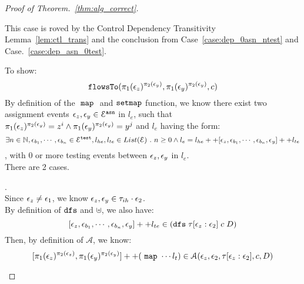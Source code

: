 \begin{proof}[Proof of Theorem.~\ref{thm:alg_correct}]
\begin{case}
\begin{subproof}
\begin{subsubcase}
    This case is roved by the Control Dependency Transitivity Lemma~\ref{lem:ctl_trans} and the conclusion from Case~\ref{case:dep_0asn_ntest} and Case.~\ref{case:dep_asn_0test}.
  \end{subsubcase}
\end{subproof}
To show:
\[  
\mathtt{flowsTo}(\pi_1(\mathtt{\epsilon}_z)^{\pi_2(\mathtt{\epsilon}_y)}, \pi_1(\mathtt{\epsilon}_y)^{\pi_2(\mathtt{\epsilon}_y)}, c)
\]
By definition of the $~\mathtt{map}~$ and $\mathtt{setmap}$ function, we know there exist 
two assignment events
$\mathtt{\epsilon}_z, \mathtt{\epsilon}_y \in \mathcal{E}^{\mathtt{{asn}}}$ in $l_e$,
such that $ \pi_1(\mathtt{\epsilon}_z)^{\pi_2(\mathtt{\epsilon}_y)} = z^i \land \pi_1(\mathtt{\epsilon}_y)^{\pi_2(\mathtt{\epsilon}_y)} = y^j$
and $l_e$ having the form:
\\
\[
 \exists  n \in \mathbb{N}, \mathtt{\epsilon}_{b_1}, \cdots, \mathtt{\epsilon}_{b_n} \in \mathcal{E}^{\mathtt{{test}}}, l_{he}, l_{te} \in List(\mathcal{E}) ~.~ 
  n \geq 0 \land l_e = l_{he} ++ [\mathtt{\epsilon}_z, \mathtt{\epsilon}_{b_1}, \cdots, \mathtt{\epsilon}_{b_n}, \mathtt{\epsilon}_y] ++ l_{te}
\]
, with $0$ or more testing events between $\mathtt{\epsilon}_z, \mathtt{\epsilon}_y$ in $l_e$.
\\
There are 2 cases.
\begin{subcase}.
%
%
\\
Since $\mathtt{\epsilon}_z \neq \mathtt{\epsilon}_1$, we know $\mathtt{\epsilon}_z, \mathtt{\epsilon}_y \in \mathtt{\tau}_{ih} \cdot \mathtt{\epsilon}_2$.
\\
By definition of $\mathtt{dfs}$ and $\uplus$,  we also have:
\[
  [\mathtt{\epsilon}_z, \mathtt{\epsilon}_{b_1}, \cdots, \mathtt{\epsilon}_{b_n}, \mathtt{\epsilon}_y] ++ l_{te} \in (\mathtt{dfs} \; {\mathtt{\tau}[\mathtt{\epsilon}_z: \mathtt{\epsilon}_2] } \; c \; D)
\]
%
Then, by definition of $\mathcal{A}$, we know:
\[
  [\pi_1(\mathtt{\epsilon}_z)^{\pi_2(\mathtt{\epsilon}_z)}, \pi_1(\mathtt{\epsilon}_y)^{\pi_2(\mathtt{\epsilon}_y)}] ++ (~\mathtt{map}~ \cdots l_t )
  \in\mathcal{A}(\mathtt{\epsilon}_z, \mathtt{\epsilon}_2, \mathtt{\tau}[\mathtt{\epsilon}_z: \mathtt{\epsilon}_2], c, D)
\]
\end{subcase}
\end{case}
\end{proof}
